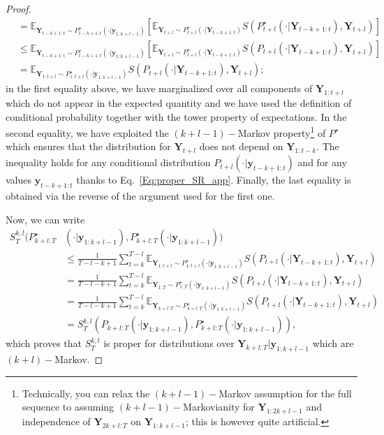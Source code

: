 \documentclass[twoside,11pt]{article}
\newcommand{\E}{\mathbb{E}}
\newcommand{\ddobs}{\mathbf{y}}
\newcommand{\Ddobs}{\mathbf{Y}}
\newcommand{\Ddobsuptminus}{\mathbf{Y}_{t-k+1:t}}
\newcommand{\ddobsuptminus}{\mathbf{y}_{t-k+1:t}}
\newcommand{\DdobsupT}{\mathbf{Y}_{1:T}}
\begin{document}
\begin{proof}
\begin{equation}
\begin{aligned}
		&= \E_{\Ddobs_{t-k+1:t} \sim P^\star_{t-k+1:t}(\cdot|\ddobs_{1:k+l-1})}\left[\E_{\Ddobs_{t+l}\sim P^\star_{t+l}(\cdot|\Ddobs_{t-k+1:t})}  S(P^\star_{t+l}(\cdot|\Ddobsuptminus), \Ddobs_{t+l}) \right] \\
		&\le \E_{\Ddobs_{t-k+1:t} \sim P^\star_{t-k+1:t}(\cdot|\ddobs_{1:k+l-1})}\left[\E_{\Ddobs_{t+l}\sim P^\star_{t+l}(\cdot|\Ddobs_{t-k+1:t})}  S(P_{t+l}(\cdot|\Ddobsuptminus), \Ddobs_{t+l}) \right]\\
		&= 	\E_{\Ddobs_{1:t+l}\sim P^\star_{1:t+l}(\cdot|\ddobs_{1:k+l-1})} S(P_{t+l}(\cdot|\Ddobs_{t-k+1:t}),\Ddobs_{t+l});
		\end{aligned}
		\end{equation}
		in the first equality above, we have marginalized over all components of $ \Ddobs_{1:t+l} $ which do not appear in the expected quantity and we have used the definition of conditional probability together with the tower property of expectations.	In the second equality, we have exploited the $ (k+l-1)-$Markov property\footnote{Technically, you can relax the $ (k+l-1)- $Markov assumption for the full sequence to assuming $ (k+l-1)-$Markovianity for $ \Ddobs_{1:2k + l -1} $ and independence of $ \Ddobs_{2k + l:T} $ on $ \Ddobs_{1:k+l-1} $; this is however quite artificial.} of $ P^\star $ which ensures that the distribution for $ \Ddobs_{t+l} $ does not depend on $ \Ddobs_{1:t-k} $.
		The inequality holds for any conditional distribution $ P_{t+l}(\cdot|\ddobsuptminus) $ and for any values $ \ddobsuptminus $ thanks to Eq.~\eqref{Eq:proper_SR_app}. Finally, the last equality is   obtained via the reverse of the argument used for the first one.
		
		Now, we can write
		\begin{equation}\label{Eq:preq_SR_proof_2}
		\begin{aligned}
		S_T^{k,l}(P^\star_{k+l:T}&(\cdot|\ddobs_{1:k+l-1}), P_{k+l:T}^\star(\cdot|\ddobs_{1:k+l-1})) \\
		&\le \frac{1}{T-l-k+1} \sum_{t=k}^{T-l} \E_{\Ddobs_{1:t+l}\sim P^\star_{1:t+l}(\cdot|\ddobs_{1:k+l-1})} S(P_{t+l}(\cdot|\Ddobs_{t-k+1:t}),\Ddobs_{t+l})  \\
		&=\frac{1}{T-l-k+1} \sum_{t=k}^{T-l} \E_{\DdobsupT\sim P^\star_{1:T}(\cdot|\ddobs_{1:k+l-1})} S(P_{t+l}(\cdot|\Ddobs_{t-k+1:t}),\Ddobs_{t+l})  \\
		&=\frac{1}{T-l-k+1} \sum_{t=k}^{T-l} \E_{\Ddobs_{k+l:T}\sim P^\star_{k+l:T}(\cdot|\ddobs_{1:k+l-1})} S(P_{t+l}(\cdot|\Ddobs_{t-k+1:t}),\Ddobs_{t+l})  \\
		&= 	S_T^{k,l}(P_{k+l:T}(\cdot|\ddobs_{1:k+l-1}), P_{k+l:T}^\star(\cdot|\ddobs_{1:k+l-1})),
		\end{aligned}
		\end{equation}
		which proves that $ S_T^{k,l} $ is proper for distributions over $ \Ddobs_{k+l:T}|\ddobs_{1:k+l-1} $ which are $ (k+l) -$Markov.
		

\end{proof}
\end{document}
